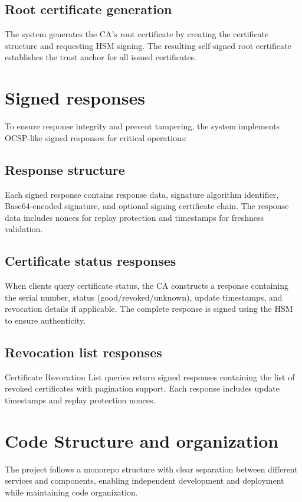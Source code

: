\subsection{Root certificate generation}
The system generates the CA's root certificate 
by creating the certificate structure and requesting HSM signing. The resulting 
self-signed root certificate establishes the trust anchor for all issued certificates.

\section{Signed responses}

To ensure response integrity and prevent tampering, the system implements 
OCSP-like signed responses for critical operations:

\subsection{Response structure}
Each signed response contains response data, 
signature algorithm identifier, Base64-encoded signature, and optional signing 
certificate chain. The response data includes nonces for replay protection 
and timestamps for freshness validation.

\subsection{Certificate status responses}
When clients query certificate status, 
the CA constructs a response containing the serial number, status (good/revoked/unknown), 
update timestamps, and revocation details if applicable. The complete response 
is signed using the HSM to ensure authenticity.

\subsection{Revocation list responses}
Certificate Revocation List queries return 
signed responses containing the list of revoked certificates with pagination 
support. Each response includes update timestamps and replay protection nonces.

\section{Code Structure and organization}

The project follows a monorepo structure with clear separation between different 
services and components, enabling independent development and deployment while 
maintaining code organization.

